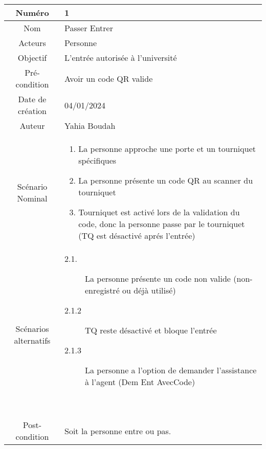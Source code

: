 
\begin{tabular}{ |c|p{12cm}| }
    \hline
    Numéro & 1 \\
    \hline
    Nom & Passer Entrer \\
    \hline
    Acteurs & Personne \\ 
    \hline
    Objectif & L'entrée autorisée à l'université \\ 
    \hline
    Pré-condition & Avoir un code QR valide \\
    \hline
    Date de création & 04/01/2024 \\
    \hline
    Auteur & Yahia Boudah \\
    \hline
    Scénario Nominal & \begin{enumerate}
        \item La personne approche une porte et un tourniquet spécifiques
        \item La personne présente un code QR au scanner du tourniquet
        \item Tourniquet est activé lors de la validation du code, donc la personne passe par le tourniquet (TQ est désactivé aprés l'entrée)
    \end{enumerate} \\
    \hline
    Scénarios alternatifs & \begin{description}
        \item[2.1.] La personne présente un code non valide (non-enregistré ou déjà utilisé)
        \item[2.1.2] TQ reste désactivé et bloque l'entrée
        \item[2.1.3] La personne a l'option de demander l'assistance à l'agent (Dem Ent AvecCode) 
    \end{description} \\
    \hline
    Post-condition & Soit la personne entre ou pas. \\
    \hline
\end{tabular}